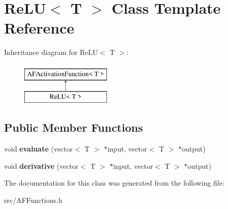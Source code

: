 \hypertarget{classReLU}{}\section{Re\+LU$<$ T $>$ Class Template Reference}
\label{classReLU}
Inheritance diagram for Re\+LU$<$ T $>$\+:\begin{figure}[H]
\begin{center}
\leavevmode
\includegraphics[height=2.000000cm]{classReLU}
\end{center}
\end{figure}
\subsection*{Public Member Functions}
\begin{DoxyCompactItemize}
\item 
\mbox{\label{classReLU_adec5299ae40b276df20448ac26126bf9}} 
void {\bfseries evaluate} (vector$<$ T $>$ $\ast$input, vector$<$ T $>$ $\ast$output)
\item 
\mbox{\label{classReLU_aeb172d142eb2806484e7765ad2bddc9a}} 
void {\bfseries derivative} (vector$<$ T $>$ $\ast$input, vector$<$ T $>$ $\ast$output)
\end{DoxyCompactItemize}


The documentation for this class was generated from the following file\+:\begin{DoxyCompactItemize}
\item 
src/A\+F\+Functions.\+h\end{DoxyCompactItemize}
